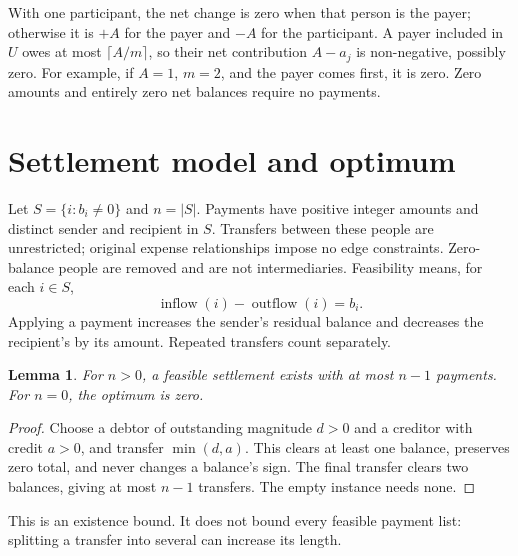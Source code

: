\documentclass[11pt]{article}
\newtheorem{lemma}[theorem]{Lemma}
\begin{document}
With one participant, the net change is zero when that person is the payer;
otherwise it is $+A$ for the payer and $-A$ for the participant. A payer
included in $U$ owes at most $\lceil A/m\rceil$, so their net contribution
$A-a_j$ is non-negative, possibly zero. For example, if $A=1$, $m=2$,
and the payer comes first, it is zero. Zero amounts and entirely zero
net balances require no payments.

\section{Settlement model and optimum}\label{sec:optimum}
Let $S=\{i:b_i\ne0\}$ and $n=|S|$. Payments have positive integer amounts
and distinct sender and recipient in $S$. Transfers between these people
are unrestricted; original expense relationships impose no edge
constraints. Zero-balance people are removed and are not intermediaries.
Feasibility means, for each $i\in S$,
\[
 \operatorname{inflow}(i)-\operatorname{outflow}(i)=b_i.
\]
Applying a payment increases the sender's residual balance and decreases
the recipient's by its amount. Repeated transfers count separately.

\begin{lemma}\label{lem:upper}
For $n>0$, a feasible settlement exists with at most $n-1$ payments.
For $n=0$, the optimum is zero.
\end{lemma}
\begin{proof}
Choose a debtor of outstanding magnitude $d>0$ and a creditor with credit
$a>0$, and transfer $\min(d,a)$. This clears at least one balance,
preserves zero total, and never changes a balance's sign. The final
transfer clears two balances, giving at most $n-1$ transfers. The empty
instance needs none.
\end{proof}
This is an existence bound. It does not bound every feasible payment
list: splitting a transfer into several can increase its length.
\end{document}
